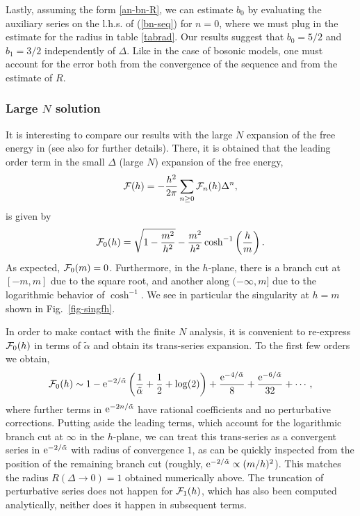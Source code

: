 \documentclass[a4paper,11pt]{article}
\theoremstyle{definition}
\newcommand{\CF}{{\cal F}}
\newcommand{\CO}{{\cal O}}
\newcommand{\re}{{\rm e}}
\newcommand{\figref}[1]{Fig.~\protect\ref{#1}}
\begin{document}
Lastly, assuming the form \eqref{an-bn-R},
 we can estimate $b_0$ by evaluating the auxiliary series on the l.h.s. of (\ref{bn-seq}) for $n=0$, 
where we must plug in the estimate for the radius in table \ref{tabrad}.
Our results suggest that $b_0=5/2$ and $b_1=3/2$ independently of $\Delta$. Like in the case of bosonic models, one must account for the error both from the convergence of the sequence and from the estimate of $R$.

\subsubsection{Large \texorpdfstring{$N$}{N} solution}

It is interesting to compare our results with the large $N$ expansion of the free energy in \cite{fnw1,fnw2} (see also \cite{dmss} for further details). There, it is obtained that the leading order term in the small $\Delta$ (large $N$) expansion of the free energy,
%
\begin{equation}
\CF(h) = -\frac{h^2}{2\pi}\sum_{n\geq 0} \CF_n(h) \Delta^{n},
\end{equation} 
%
is given by
%
\begin{equation}
\CF_0(h) = \sqrt{1-\frac{m^2}{h^2}}-\frac{m^2}{h^2} \cosh ^{-1}\left(\frac{h}{m}\right).
\end{equation}
%
As expected, $\CF_0(m)=0$. Furthermore, in the $h$-plane, there is a branch cut at $[-m,m]$  due to the square root, 
and another along $(-\infty,m]$ due to the logarithmic behavior of $\cosh^{-1}$. We see in particular the singularity at 
$h=m$ shown in \figref{fig-singfh}. 

In order to make contact with the finite $N$ analysis, it is convenient to re-express $\CF_0(h)$ in terms of $\tilde\alpha$ and obtain its trans-series expansion. To the first few orders we obtain,
\begin{equation}
\CF_0(h)\sim 
1
-\re^{-2/\tilde\alpha } \left(\frac{1}{\tilde\alpha }+\frac{1}{2}+\log (2)\right)
+\frac{\re^{-4/\tilde\alpha }}{8}
+\frac{\re^{-6/\tilde\alpha }}{32}
+\cdots,
\end{equation}
where further terms in $\re^{-2n/\tilde\alpha}$ have rational coefficients and  no perturbative corrections.
Putting aside the leading terms, which account for the logarithmic branch cut at $\infty$ in the $h$-plane, we can treat this trans-series as a convergent series in $\re^{-2/\tilde\alpha}$ with radius of convergence $1$, as can be quickly inspected from the position of the remaining branch cut (roughly, $\re^{-2/\tilde{\alpha}}\propto (m/h)^2$). This matches the radius $R(\Delta\rightarrow 0)=1$ obtained numerically above.
The truncation of perturbative series does not happen for $\CF_1(h)$, which has also been computed analytically, neither does it happen in subsequent terms. 
\end{document}
